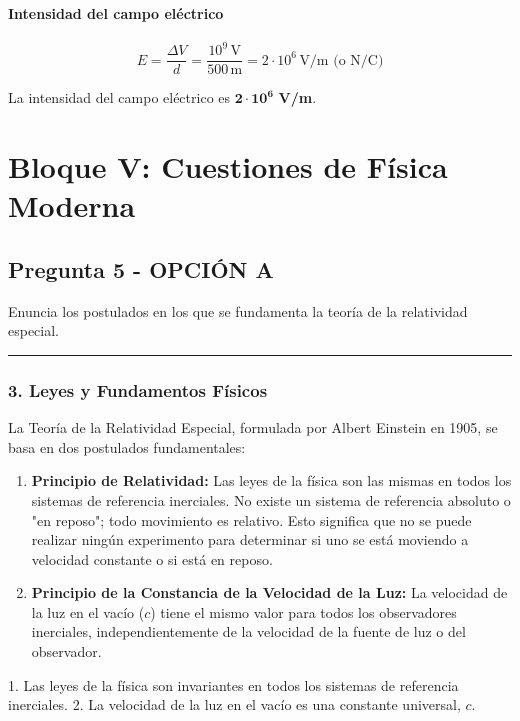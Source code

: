 \paragraph*{Intensidad del campo eléctrico}
$$E = \frac{\Delta V}{d} = \frac{10^9 \, \text{V}}{500 \, \text{m}} = 2 \cdot 10^6 \, \text{V/m (o N/C)}$$
\begin{cajaresultado}
    La intensidad del campo eléctrico es $\boldsymbol{2 \cdot 10^6}$ \textbf{V/m}.
\end{cajaresultado}

\newpage

\section{Bloque V: Cuestiones de Física Moderna}
\label{sec:moderna_2004_jun_ord}

\subsection{Pregunta 5 - OPCIÓN A}
\label{subsec:5A_2004_jun_ord}

\begin{cajaenunciado}
Enuncia los postulados en los que se fundamenta la teoría de la relatividad especial.
\end{cajaenunciado}
\hrule

\subsubsection*{3. Leyes y Fundamentos Físicos}
La Teoría de la Relatividad Especial, formulada por Albert Einstein en 1905, se basa en dos postulados fundamentales:
\begin{enumerate}
    \item \textbf{Principio de Relatividad:} Las leyes de la física son las mismas en todos los sistemas de referencia inerciales. No existe un sistema de referencia absoluto o "en reposo"; todo movimiento es relativo. Esto significa que no se puede realizar ningún experimento para determinar si uno se está moviendo a velocidad constante o si está en reposo.
    \item \textbf{Principio de la Constancia de la Velocidad de la Luz:} La velocidad de la luz en el vacío ($c$) tiene el mismo valor para todos los observadores inerciales, independientemente de la velocidad de la fuente de luz o del observador.
\end{enumerate}
\begin{cajaresultado}
1. Las leyes de la física son invariantes en todos los sistemas de referencia inerciales.
2. La velocidad de la luz en el vacío es una constante universal, $c$.
\end{cajaresultado}

